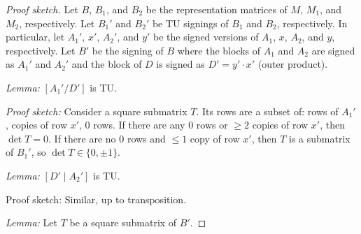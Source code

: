 \begin{proof}[Proof sketch]

  Let $B$, $B_{1}$, and $B_{2}$ be the representation matrices of $M$, $M_{1}$, and $M_{2}$, respectively.
  Let $B_{1}'$ and $B_{2}'$ be TU signings of $B_{1}$ and $B_{2}$, respectively.
  In particular, let $A_{1}'$, $x'$, $A_{2}'$, and $y'$ be the signed versions of $A_{1}$, $x$, $A_{2}$, and $y$, respectively.
  Let $B'$ be the signing of $B$ where the blocks of $A_{1}$ and $A_{2}$ are signed as $A_{1}'$ and $A_{2}'$ and the block of $D$ is signed as $D' = y' \cdot x'$ (outer product).

  \emph{Lemma:} $\left[ A_{1}' / D' \right]$ is TU.

  \emph{Proof sketch:} Consider a square submatrix $T$. Its rows are a subset of: rows of $A_{1}'$, copies of row $x'$, $0$ rows.
  If there are any $0$ rows or $\geq 2$ copies of row $x'$, then $\det T = 0$.
  If there are no $0$ rows and $\leq 1$ copy of row $x'$, then $T$ is a submatrix of $B_{1}'$, so $\det T \in \{0, \pm 1\}$.

  \emph{Lemma:} $\left[D' \mid A_{2}' \right]$ is TU.

  Proof sketch: Similar, up to transposition.

  \emph{Lemma:} Let $T$ be a square submatrix of $B'$.


\end{proof}
